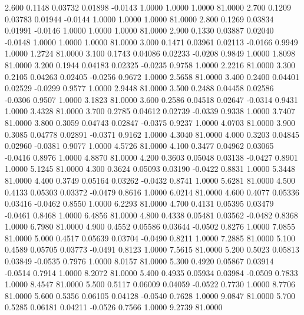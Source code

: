    2.600   0.1148   0.03732   0.01898  -0.0143   1.0000   1.0000   1.0000  81.0000
   2.700   0.1209   0.03783   0.01944  -0.0144   1.0000   1.0000   1.0000  81.0000
   2.800   0.1269   0.03834   0.01991  -0.0146   1.0000   1.0000   1.0000  81.0000
   2.900   0.1330   0.03887   0.02040  -0.0148   1.0000   1.0000   1.0000  81.0000
   3.000   0.1471   0.03961   0.02113  -0.0166   0.9949   1.0000   1.2724  81.0000
   3.100   0.1743   0.04086   0.02233  -0.0208   0.9849   1.0000   1.8098  81.0000
   3.200   0.1944   0.04183   0.02325  -0.0235   0.9758   1.0000   2.2216  81.0000
   3.300   0.2105   0.04263   0.02405  -0.0256   0.9672   1.0000   2.5658  81.0000
   3.400   0.2400   0.04401   0.02529  -0.0299   0.9577   1.0000   2.9448  81.0000
   3.500   0.2488   0.04458   0.02586  -0.0306   0.9507   1.0000   3.1823  81.0000
   3.600   0.2586   0.04518   0.02647  -0.0314   0.9431   1.0000   3.4328  81.0000
   3.700   0.2785   0.04612   0.02739  -0.0339   0.9338   1.0000   3.7407  81.0000
   3.800   0.3059   0.04743   0.02847  -0.0375   0.9237   1.0000   4.0703  81.0000
   3.900   0.3085   0.04778   0.02891  -0.0371   0.9162   1.0000   4.3040  81.0000
   4.000   0.3203   0.04845   0.02960  -0.0381   0.9077   1.0000   4.5726  81.0000
   4.100   0.3477   0.04962   0.03065  -0.0416   0.8976   1.0000   4.8870  81.0000
   4.200   0.3603   0.05048   0.03138  -0.0427   0.8901   1.0000   5.1245  81.0000
   4.300   0.3624   0.05093   0.03190  -0.0422   0.8831   1.0000   5.3448  81.0000
   4.400   0.3749   0.05164   0.03262  -0.0432   0.8741   1.0000   5.6281  81.0000
   4.500   0.4133   0.05303   0.03372  -0.0479   0.8616   1.0000   6.0214  81.0000
   4.600   0.4077   0.05336   0.03416  -0.0462   0.8550   1.0000   6.2293  81.0000
   4.700   0.4131   0.05395   0.03479  -0.0461   0.8468   1.0000   6.4856  81.0000
   4.800   0.4338   0.05481   0.03562  -0.0482   0.8368   1.0000   6.7980  81.0000
   4.900   0.4552   0.05586   0.03644  -0.0502   0.8276   1.0000   7.0855  81.0000
   5.000   0.4517   0.05639   0.03704  -0.0490   0.8211   1.0000   7.2885  81.0000
   5.100   0.4589   0.05705   0.03773  -0.0491   0.8123   1.0000   7.5615  81.0000
   5.200   0.5023   0.05813   0.03849  -0.0535   0.7976   1.0000   8.0157  81.0000
   5.300   0.4920   0.05867   0.03914  -0.0514   0.7914   1.0000   8.2072  81.0000
   5.400   0.4935   0.05934   0.03984  -0.0509   0.7833   1.0000   8.4547  81.0000
   5.500   0.5117   0.06009   0.04059  -0.0522   0.7730   1.0000   8.7706  81.0000
   5.600   0.5356   0.06105   0.04128  -0.0540   0.7628   1.0000   9.0847  81.0000
   5.700   0.5285   0.06181   0.04211  -0.0526   0.7566   1.0000   9.2739  81.0000
